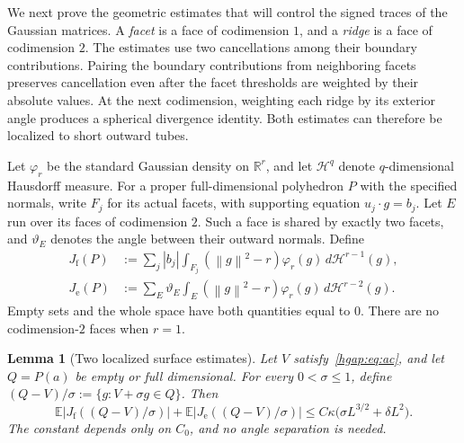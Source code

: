 \documentclass[11pt,letterpaper,twoside,leqno]{article}
\theoremstyle{bookplain}
\newtheorem{lemma}{Lemma}
\theoremstyle{bookremark}
\newcommand{\E}{\mathbb E}
\newcommand{\R}{\mathbb R}
\newcommand{\norm}[1]{\left\lVert#1\right\rVert}
\newcommand{\dd}{\,d}
\begin{document}
We next prove the geometric estimates that will control the signed
traces of the Gaussian matrices. A \emph{facet} is a face of codimension
$1$, and a \emph{ridge} is a face of codimension $2$. The estimates use
two cancellations among their boundary contributions.
Pairing the boundary contributions from neighboring facets preserves
cancellation even after the facet thresholds are weighted by their
absolute values. At the next codimension, weighting
each ridge by its exterior angle produces a spherical divergence identity.
Both estimates can therefore be localized to short outward tubes.

Let $\varphi_r$ be the standard Gaussian density on $\R^r$, and let
$\mathcal H^q$ denote $q$-dimensional Hausdorff measure.
For a proper full-dimensional polyhedron $P$ with the specified normals,
write $F_j$ for its actual facets, with supporting equation
$u_j\cdot g=b_j$. Let $E$ run over its faces of codimension $2$.
Such a face is shared by exactly two facets, and $\vartheta_E$ denotes
the angle between their outward normals. Define
\begin{align}
 J_{\mathrm f}(P)&:=\sum_j |b_j|
   \int_{F_j}(\norm g^2-r)\varphi_r(g)\dd\mathcal H^{r-1}(g),
 \label{hgap:eq:Jf}\\
 J_{\mathrm e}(P)&:=\sum_E \vartheta_E
   \int_E(\norm g^2-r)\varphi_r(g)\dd\mathcal H^{r-2}(g).
 \label{hgap:eq:Je}
\end{align}
Empty sets and the whole space have both quantities equal to $0$.
There are no codimension-$2$ faces when $r=1$.

\begin{lemma}[Two localized surface estimates]\label{hgap:lem:surfaces}
Let $V$ satisfy~\eqref{hgap:eq:ac}, and let $Q=P(a)$ be empty or full
dimensional. For every $0<\sigma\le1$, define
$(Q-V)/\sigma:=\{g:V+\sigma g\in Q\}$. Then
\begin{equation}
 \E\bigl|J_{\mathrm f}((Q-V)/\sigma)\bigr|
 +\E\bigl|J_{\mathrm e}((Q-V)/\sigma)\bigr|
 \le C\kappa\bigl(\sigma L^{3/2}+\delta L^2\bigr).
 \label{hgap:eq:surface-bounds}
\end{equation}
The constant depends only on $C_0$, and no angle separation is needed.
\end{lemma}
\end{document}
